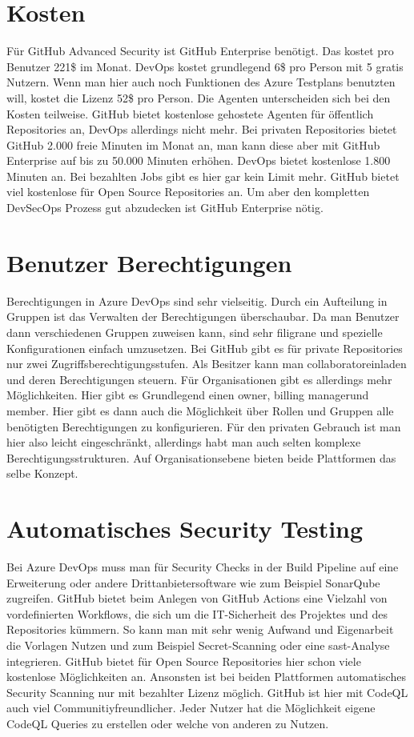 \section{Kosten}
Für GitHub Advanced Security ist GitHub Enterprise benötigt. Das kostet pro Benutzer 221\$ im Monat. DevOps kostet grundlegend 6\$ pro Person mit 5 gratis Nutzern. Wenn man hier auch noch Funktionen des Azure Testplans benutzten will, kostet die Lizenz 52\$ pro Person.
Die Agenten unterscheiden sich bei den Kosten teilweise. GitHub bietet kostenlose gehostete Agenten für öffentlich Repositories an, DevOps allerdings nicht mehr. Bei privaten Repositories bietet GitHub 2.000 freie Minuten im Monat an, man kann diese aber mit GitHub Enterprise auf bis zu 50.000 Minuten erhöhen. DevOps bietet kostenlose 1.800 Minuten an. Bei bezahlten Jobs gibt es hier gar kein Limit mehr. 
GitHub bietet viel kostenlose für Open Source Repositories an. Um aber den kompletten DevSecOps Prozess gut abzudecken ist GitHub Enterprise nötig.

\section{Benutzer Berechtigungen}
Berechtigungen in Azure DevOps sind sehr vielseitig. Durch ein Aufteilung in Gruppen ist das Verwalten der Berechtigungen überschaubar. Da man Benutzer dann verschiedenen Gruppen zuweisen kann, sind sehr filigrane und spezielle Konfigurationen einfach umzusetzen. \cite{KathrynEE_fd} Bei GitHub gibt es für private Repositories nur zwei Zugriffsberechtigungsstufen. Als Besitzer kann man \glqq collaborator\grqq\enspace einladen und deren Berechtigungen steuern. Für Organisationen gibt es allerdings mehr Möglichkeiten. Hier gibt es Grundlegend einen \glqq owner\grqq , \glqq billing manager\grqq\enspace und \glqq member\grqq . Hier gibt es dann auch die Möglichkeit über Rollen und Gruppen alle benötigten Berechtigungen zu konfigurieren. \cite{github-permissions} Für den privaten Gebrauch ist man hier also leicht eingeschränkt, allerdings habt man auch selten komplexe Berechtigungsstrukturen. Auf Organisationsebene bieten beide Plattformen das selbe Konzept.

\section{Automatisches Security Testing}
Bei Azure DevOps muss man für Security Checks in der Build Pipeline auf eine Erweiterung oder andere Drittanbietersoftware wie zum Beispiel SonarQube zugreifen. GitHub bietet beim Anlegen von GitHub Actions eine Vielzahl von vordefinierten Workflows, die sich um die IT-Sicherheit des Projektes und des Repositories kümmern. So kann man mit sehr wenig Aufwand und Eigenarbeit die Vorlagen Nutzen und zum Beispiel Secret-Scanning oder eine \ac{sast}-Analyse integrieren. GitHub bietet für Open Source Repositories hier schon viele kostenlose Möglichkeiten an. Ansonsten ist bei beiden Plattformen automatisches Security Scanning nur mit bezahlter Lizenz möglich. GitHub ist hier mit CodeQL auch viel Communitiyfreundlicher. Jeder Nutzer hat die Möglichkeit eigene CodeQL Queries zu erstellen oder welche von anderen zu Nutzen. \cite{Porta2021-vz}

